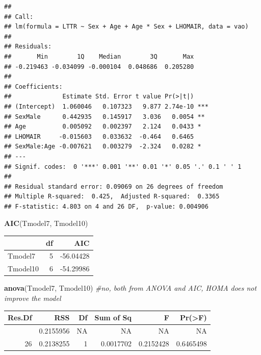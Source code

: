 \documentclass[
]{article}
\newenvironment{Shaded}{\begin{snugshade}}{\end{snugshade}}
\newcommand{\CommentTok}[1]{\textcolor[rgb]{0.56,0.35,0.01}{\textit{#1}}}
\newcommand{\FunctionTok}[1]{\textcolor[rgb]{0.13,0.29,0.53}{\textbf{#1}}}
\newcommand{\NormalTok}[1]{#1}
\begin{document}
\begin{verbatim}
## 
## Call:
## lm(formula = LTTR ~ Sex + Age + Age * Sex + LHOMAIR, data = vao)
## 
## Residuals:
##       Min        1Q    Median        3Q       Max 
## -0.219463 -0.034099 -0.000104  0.048686  0.205280 
## 
## Coefficients:
##              Estimate Std. Error t value Pr(>|t|)    
## (Intercept)  1.060046   0.107323   9.877 2.74e-10 ***
## SexMale      0.442935   0.145917   3.036   0.0054 ** 
## Age          0.005092   0.002397   2.124   0.0433 *  
## LHOMAIR     -0.015603   0.033632  -0.464   0.6465    
## SexMale:Age -0.007621   0.003279  -2.324   0.0282 *  
## ---
## Signif. codes:  0 '***' 0.001 '**' 0.01 '*' 0.05 '.' 0.1 ' ' 1
## 
## Residual standard error: 0.09069 on 26 degrees of freedom
## Multiple R-squared:  0.425,  Adjusted R-squared:  0.3365 
## F-statistic: 4.803 on 4 and 26 DF,  p-value: 0.004906
\end{verbatim}

\begin{Shaded}
\begin{Highlighting}[]
\FunctionTok{AIC}\NormalTok{(Tmodel7, Tmodel10)}
\end{Highlighting}
\end{Shaded}

\begin{longtable}[]{@{}lrr@{}}
\toprule\noalign{}
& df & AIC \\
\midrule\noalign{}
\endhead
\bottomrule\noalign{}
\endlastfoot
Tmodel7 & 5 & -56.04428 \\
Tmodel10 & 6 & -54.29986 \\
\end{longtable}

\begin{Shaded}
\begin{Highlighting}[]
\FunctionTok{anova}\NormalTok{(Tmodel7, Tmodel10) }\CommentTok{\#no, both from ANOVA and AIC, HOMA does not improve the model}
\end{Highlighting}
\end{Shaded}

\begin{longtable}[]{@{}rrrrrr@{}}
\toprule\noalign{}
Res.Df & RSS & Df & Sum of Sq & F & Pr(\textgreater F) \\
\midrule\noalign{}
\endhead
\bottomrule\noalign{}
\endlastfoot
27 & 0.2155956 & NA & NA & NA & NA \\
26 & 0.2138255 & 1 & 0.0017702 & 0.2152428 & 0.6465498 \\
\end{longtable}
\end{document}
